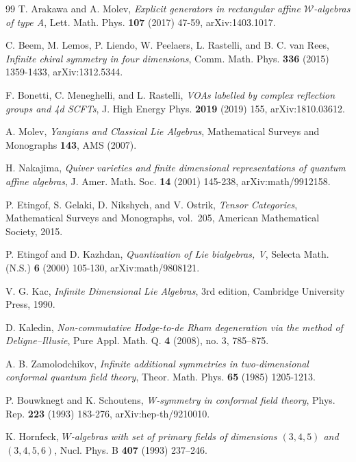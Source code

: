 \begin{thebibliography}{99}
T. Arakawa and A. Molev, \emph{Explicit generators in rectangular affine 
$\mathcal{W}$-algebras of type A}, 
Lett. Math. Phys. \textbf{107} (2017) 47-59, arXiv:1403.1017.

C. Beem, M. Lemos, P. Liendo, W. Peelaers, L. Rastelli, and B. C. van Rees,
\emph{Infinite chiral symmetry in four dimensions},
Comm. Math. Phys. \textbf{336} (2015) 1359-1433, arXiv:1312.5344.

F. Bonetti, C. Meneghelli, and L. Rastelli,
\emph{VOAs labelled by complex reflection groups and 4d SCFTs},
J. High Energy Phys. \textbf{2019} (2019) 155, arXiv:1810.03612.


A. Molev, \emph{Yangians and Classical Lie Algebras}, 
Mathematical Surveys and Monographs \textbf{143}, AMS (2007).

H. Nakajima, \emph{Quiver varieties and finite dimensional representations of 
quantum affine algebras}, 
J. Amer. Math. Soc. \textbf{14} (2001) 145-238, arXiv:math/9912158.


P. Etingof, S. Gelaki, D. Nikshych, and V. Ostrik,
\emph{Tensor Categories}, Mathematical Surveys and Monographs,
vol.~205, American Mathematical Society, 2015.

P. Etingof and D. Kazhdan, \emph{Quantization of Lie bialgebras, V},
Selecta Math. (N.S.) \textbf{6} (2000) 105-130, arXiv:math/9808121.


V. G. Kac, \emph{Infinite Dimensional Lie Algebras},
3rd edition, Cambridge University Press, 1990.

D. Kaledin, \emph{Non-commutative Hodge-to-de Rham degeneration via the method of Deligne--Illusie},
Pure Appl. Math. Q. \textbf{4} (2008), no. 3, 785--875.

A. B. Zamolodchikov, \emph{Infinite additional symmetries in two-dimensional conformal quantum field theory},
Theor. Math. Phys. \textbf{65} (1985) 1205-1213.

P. Bouwknegt and K. Schoutens, \emph{W-symmetry in conformal field theory},
Phys. Rep. \textbf{223} (1993) 183-276, arXiv:hep-th/9210010.

K. Hornfeck, \emph{$W$-algebras with set of primary fields of dimensions $(3,4,5)$ and $(3,4,5,6)$},
Nucl. Phys. B \textbf{407} (1993) 237--246.


\end{thebibliography}
